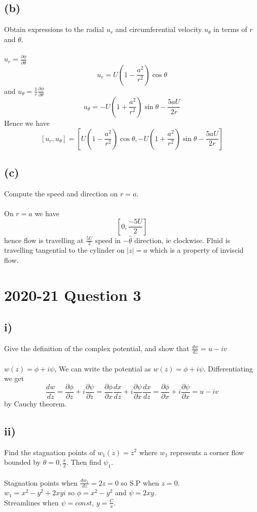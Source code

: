\documentclass[1pt]{article}
\begin{document}
\subsection{(b)}
Obtain expressions to the radial $u_r$ and circumferential velocity $u_{\theta}$ in terms of $r$ and $\theta$.
\\
\\ $u_r=\frac{\partial \phi}{\partial\theta}$ $$u_r=U(1-\frac{a^2}{r^2})\cos\theta$$ and $u_{\theta}=\frac{1}{r}\frac{\partial\phi}{\partial\theta}$ 
$$u_{\theta}=-U(1+\frac{a^2}{r^2})\sin\theta-\frac{5aU}{2r}$$
Hence we have $$[u_r,u_{\theta}]=[U(1-\frac{a^2}{r^2})\cos\theta ,-U(1+\frac{a^2}{r^2})\sin\theta-\frac{5aU}{2r}]$$
\subsection{(c)}
Compute the speed and direction on $r=a$.
\\
\\On $r=a$ we have $$[0,\frac{-5U}{2}]$$ hence flow is travelling at $\frac{5U}{2}$ speed in $-\underline{\hat{\theta}}$ direction, ie clockwise. Fluid is travelling tangential to the cylinder on $|z|=a$ which is a property of inviscid flow.
\newpage


\section{2020-21 Question 3}
\subsection{i)}
Give the definition of the complex potential, and show that $\frac{dw}{dz}=u-iv$
\\
\\ $w(z)=\phi+i\psi$, We can write the potential as $w(z)=\phi+i\psi$. Differentiating we get $$\frac{dw}{dz}=\frac{\partial\phi}{\partial z}+i\frac{\partial \psi}{\partial z}=\frac{\partial\phi}{\partial x}\frac{dx}{dz}+i\frac{\partial\psi}{\partial x}\frac{dx}{dz}=\frac{\partial\phi}{\partial x}+i\frac{\partial\psi}{\partial x}=u-iv$$ by Cauchy theorem.

\subsection{ii)}
Find the stagnation points of $w_1(z)=z^2$ where $w_1$ represents a corner flow bounded by $\theta=0,\frac{\pi}{2}$. Then find $\psi_1$.
\\
\\ Stagnation points when $\frac{dw_1}{dz}=2z=0$ so S.P when $z=0$.
\\ $w_1=x^2-y^2+2xyi$ so $\phi=x^2-y^2$ and $\psi=2xy$.
\\ Streamlines when $\psi=const$, $y=\frac{C}{x}$.
\end{document}
